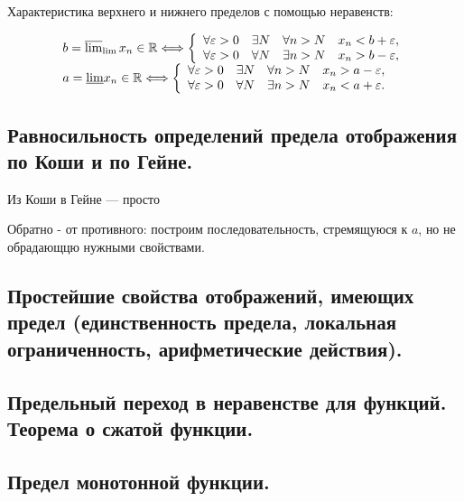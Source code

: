 \documentclass[12pt, a4paper]{article}
\begin{document}
Характеристика верхнего и нижнего пределов с помощью неравенств:

\begin{equation}
    \begin{array}{l}
        b=\varlimsup_{\lim } x_{n} \in \mathbb{R} \Longleftrightarrow\left\{\begin{array}{llll}
        \forall \varepsilon>0 & \exists N & \forall n>N & x_{n}<b+\varepsilon, \\
        \forall \varepsilon>0 & \forall N & \exists n>N & x_{n}>b-\varepsilon,
    \end{array}\right. \\
        a=\underline{\lim } x_{n} \in \mathbb{R} \Longleftrightarrow\left\{\begin{array}{llll}
        \forall \varepsilon>0 & \exists N & \forall n>N & x_{n}>a-\varepsilon, \\
        \forall \varepsilon>0 & \forall N & \exists n>N & x_{n}<a+\varepsilon .
    \end{array}\right.
    \end{array}
\end{equation}




\subsection{Равносильность определений предела отображения по Коши и по Гейне.}

Из Коши в Гейне — просто

Обратно - от противного: построим последовательность, стремящуюся к $a$, но не обрадающцю нужными свойствами.


\subsection{Простейшие свойства отображений, имеющих предел (единственность предела, локальная ограниченность, арифметические действия).}

\subsection{Предельный переход в неравенстве для функций. Теорема о сжатой функции.}

\subsection{Предел монотонной функции.}
\end{document}
